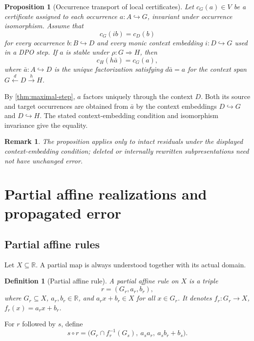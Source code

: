 \documentclass[12pt,a4paper,twoside]{extarticle}
\makeatletter
\theoremstyle{compactplain}
\newtheorem{proposition}[theorem]{Proposition}
\theoremstyle{compactdef}
\newtheorem{definition}[theorem]{Definition}
\newtheorem{remark}[theorem]{Remark}
\renewenvironment{proof}[1][\proofname]{\par\pushQED{\qed}\normalfont
  \topsep2pt\trivlist\item[\hskip\labelsep\bfseries #1\@addpunct{.}]\ignorespaces}
 {\popQED\endtrivlist\@endpefalse}
\newcommand{\mono}{\hookrightarrow}
\makeatother
\begin{document}
\begin{proposition}[Occurrence transport of local certificates]\label{prop:certificate-transport}
Let $c_G(a)\in V$ be a certificate assigned to each occurrence $a:A\mono G$, invariant under occurrence isomorphism.  Assume that
\[
  c_G(i b)=c_D(b)
\]
for every occurrence $b:B\mono D$ and every monic context embedding $i:D\mono G$ used in a DPO step.  If $a$ is stable under $\rho:G\Rightarrow H$, then
\[
  c_H(h\bar a)=c_G(a),
\]
where $\bar a:A\mono D$ is the unique factorization satisfying $d\bar a=a$ for the context span $G\xleftarrow dD\xrightarrow hH$.
\end{proposition}
\begin{proof}
By \cref{thm:maximal-step}, $a$ factors uniquely through the context $D$.  Both its source and target occurrences are obtained from $\bar a$ by the context embeddings $D\mono G$ and $D\mono H$.  The stated context-embedding condition and isomorphism invariance give the equality.
\end{proof}

\begin{remark}
The proposition applies only to intact residuals under the displayed context-embedding condition; deleted or internally rewritten subpresentations need not have unchanged error.
\end{remark}
\section{Partial affine realizations and propagated error}

\subsection{Partial affine rules}
Let $X\subseteq\mathbb R$. A partial map is always understood together with its actual domain.

\begin{definition}[Partial affine rule]
A partial affine rule on $X$ is a triple
\[
r=(G_r,a_r,b_r),
\]
where $G_r\subseteq X$, $a_r,b_r\in\mathbb R$, and $a_rx+b_r\in X$ for all $x\in G_r$. It denotes $f_r:G_r\to X$, $f_r(x)=a_rx+b_r$.
\end{definition}
For $r$ followed by $s$, define
\begin{equation}\label{eq:partial-affine-compose}
s\circ r=\bigl(G_r\cap f_r^{-1}(G_s),\ a_sa_r,\ a_sb_r+b_s\bigr).
\end{equation}
\end{document}
